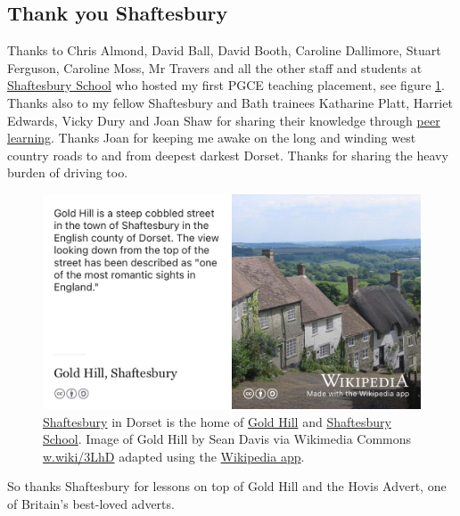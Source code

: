 \documentclass[
]{book}
\begin{document}
\hypertarget{shaftesbury}{%
\subsection{Thank you Shaftesbury}\label{shaftesbury}}

Thanks to Chris Almond, David Ball, David Booth, Caroline Dallimore, Stuart Ferguson, Caroline Moss, Mr Travers and all the other staff and students at \href{https://en.wikipedia.org/wiki/Shaftesbury_School}{Shaftesbury School} who hosted my first PGCE teaching placement, see figure \ref{fig:shaft-fig}. Thanks also to my fellow Shaftesbury and Bath trainees Katharine Platt, Harriet Edwards, Vicky Dury and Joan Shaw for sharing their knowledge through \href{https://en.wikipedia.org/wiki/Peer_learning}{peer learning}. Thanks Joan for keeping me awake on the long and winding west country roads to and from deepest darkest Dorset. Thanks for sharing the heavy burden of driving too.

\begin{figure}

{\centering \includegraphics[width=1\linewidth]{images/shaftesbury} 

}

\caption{\href{https://en.wikipedia.org/wiki/Shaftesbury}{Shaftesbury} in Dorset is the home of \href{https://en.wikipedia.org/wiki/Gold_Hill,_Shaftesbury}{Gold Hill} and \href{https://en.wikipedia.org/wiki/Shaftesbury_School}{Shaftesbury School}. Image of Gold Hill by Sean Davis via Wikimedia Commons \href{https://w.wiki/3LhD}{w.wiki/3LhD} adapted using the \href{https://apps.apple.com/us/app/wikipedia/id324715238}{Wikipedia app}.}\label{fig:shaft-fig}
\end{figure}



So thanks Shaftesbury for lessons on top of Gold Hill and the Hovis Advert, one of Britain's best-loved adverts. \citep{hovisadvert} 🍞
\end{document}
